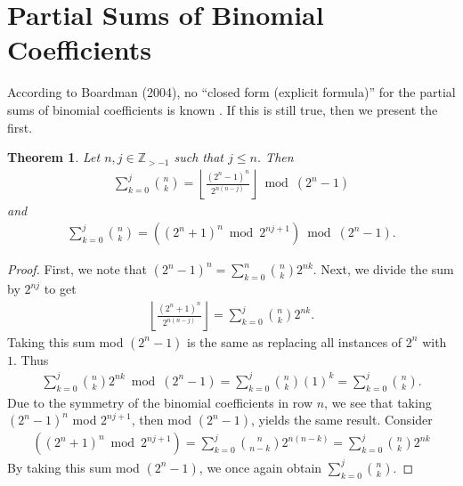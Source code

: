 \documentclass{article}
\theoremstyle{plain}
\newtheorem{theorem}{Theorem}
\theoremstyle{definition}
\newcommand{\floor}[1]{\left\lfloor #1 \right\rfloor}
\newcommand{\Z}{\mathbb{Z}}
\begin{document}
\section{Partial Sums of Binomial Coefficients} \label{section:partialsums}
According to Boardman (2004), no ``closed form (explicit formula)'' for the partial sums of binomial coefficients is known \cite{boardman2004eggdropnumbers}. If this is still true, then we present the first.

\begin{theorem} \label{proof:binomialcoeffpartialsums}
Let $n,j \in \Z_{>-1}$ such that $j \leq n$. Then
\begin{align*}
\sum_{k=0}^{j} \binom{n}{k}
= \floor{\frac{(2^n-1)^n}{2^{n(n-j)}}} \bmod (2^n-1)
\end{align*}
and
\begin{align*}
\sum_{k=0}^{j} \binom{n}{k}
= \left( (2^n+1)^n \bmod 2^{nj+1} \right) \bmod (2^n-1) .
\end{align*}
\end{theorem}
\begin{proof}
First, we note that $(2^n-1)^n = \sum_{k=0}^n \binom{n}{k} 2^{nk}$.
Next, we divide the sum by $2^{nj}$ to get
\begin{align*}
    \floor{\frac{(2^n+1)^n}{2^{n(n-j)}}}
    = \sum_{k=0}^{j} \binom{n}{k} 2^{nk} .
\end{align*}
Taking this sum mod $(2^n-1)$ is the same as replacing all instances of $2^n$ with $1$. Thus
\begin{align*}
    \sum_{k=0}^{j} \binom{n}{k} 2^{nk} \bmod (2^n-1)
    = \sum_{k=0}^{j} \binom{n}{k} (1)^{k}
    = \sum_{k=0}^{j} \binom{n}{k} .
\end{align*}
Due to the symmetry of the binomial coefficients in row $n$, we see that taking $(2^n-1)^n$ mod $2^{nj+1}$, then mod $(2^n-1)$, yields the same result. Consider
\begin{align*}
    \left( (2^n+1)^n \bmod 2^{nj+1} \right)
    = \sum_{k=0}^{j} \binom{n}{n-k} 2^{n(n-k)}
    = \sum_{k=0}^{j} \binom{n}{k} 2^{nk}
\end{align*}
By taking this sum mod $(2^n-1)$, we once again obtain $\sum_{k=0}^{j} \binom{n}{k}$.
\end{proof}
\end{document}
